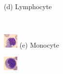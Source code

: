 \begin{figure}
\begin{minipage}{0.22\textwidth}
        (d) Lymphocyte
    \end{minipage}
    \\[1em]
    \begin{minipage}{0.22\textwidth}
        \includegraphics[width=\linewidth]{images/bloodmnist_classes/monocyte.png}
        (e) Monocyte
    \end{minipage}
    \hfill
    \begin{minipage}{0.22\textwidth}
        \includegraphics[width=\linewidth]{images/bloodmnist_classes/immature_granulocytes.png}

\end{minipage}
\end{figure}
